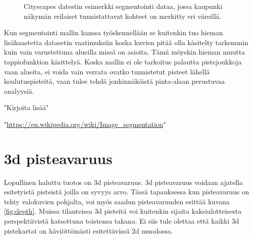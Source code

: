 \begin{figure}
\centering
{}
\caption[Tämä on lyhyt kuvateksti.]{Cityscapes datestin esimerkki segmentointi dataa, jossa kaupunki näkymän erilaiset tunnistattavat kohteet on merkitty eri väreillä.}
\label{fig:labels}
\end{figure}

Kun segmentointi mallin kanssa työskennellään se kuitenkin tuo hieman lisähaastetta datasetin vaatimuksiin koska kuvien pitää olla käsitelty tarkemmin kuin vain varustettuna alueilla missä on asioita. Tämä möyskin hieman muutta tappiofunktion käsittelyä. Koska mallin ei ole tarkoitus palautta pistejoukkoja vaan alueita, ei voida vain verrata ovatko tunnistetut pisteet lähellä koulutuspisteitä, vaan tulee tehdä jonkinnäköistä pinta-alaan perustuvaa analyysiä. 

"Kirjoita lisää"

"\url{https://en.wikipedia.org/wiki/Image_segmentation}"

\section{3d pisteavaruus}

Lopullinen haluttu tuotos on 3d  pisteavaruus. 3d pisteavaruus voidaan ajatella esitetyistä pisteistä joilla on syvyys arvo. Tässä tapauksessa kun pisteavaruus on tehty valokuvien pohjalta, voi myös saadun pisteavaruuden esittää kuvana \ref{fig:depth}. Muissa tilanteissa 3d pisteitä voi kuitenkin sijaita kaksiulotteisesta perspektiivistä katsottuna toistensa takana. Ei siis tule olettaa että kaikki 3d pistekartat on häviöttömästi esitettävissä 2d muodossa. 


